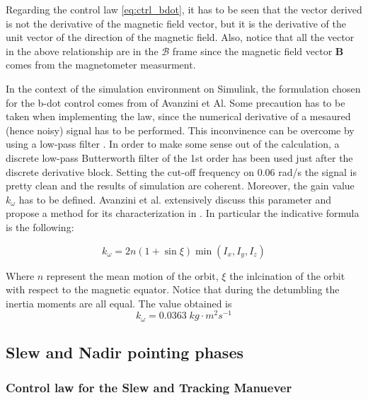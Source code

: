 Regarding the control law \autoref{eq:ctrl_bdot}, it has to be seen that the vector derived is not the derivative of the magnetic field vector, but it is the derivative of the unit vector of the 
direction of the magnetic field. Also, notice that all the vector in the above relationship are in the $\mathcal{B}$ frame since the magnetic 
field vector $\boldsymbol{B}$ comes from the magnetometer measurment.

In the context of the simulation environment on Simulink, the formulation chosen for the b-dot control comes from \cite{bdot} of Avanzini et Al. Some precaution has to be taken
when implementing the law, since the numerical derivative of a mesaured (hence noisy) signal has to be performed. This inconvinence can be overcome by using a low-pass filter \cite{crass_book}.
In order to make some sense out of the calculation, a discrete low-pass Butterworth filter of the 1st order has been used just after the discrete derivative block. 
Setting the cut-off frequency on 0.06 rad/s the signal is pretty clean and the results of simulation are coherent.
Moreover, the gain value $k_{\omega}$ has to be defined. Avanzini et al. extensively discuss this parameter and propose a method for its characterization in \cite{bdot}. In particular the indicative formula is the following:

\begin{equation}
    k_{\omega} = 2n (1 + \sin{\xi}) \min{\left( I_x, I_y, I_z \right)}
\end{equation}

Where $n$ represent the mean motion of the orbit, $\xi$ the inlcination of the orbit with respect to the magnetic equator. Notice that  during the detumbling the inertia moments are all equal. The value obtained is 
\begin{equation*}
    k_{\omega} = 0.0363 \; kg\cdot m^2s^{-1}
\end{equation*}



\subsection{Slew and Nadir pointing phases}
\label{subsec:slew_subsec}

\subsubsection{Control law for the Slew and Tracking Manuever}
\label{subsubsec:slew_nadir_law}


